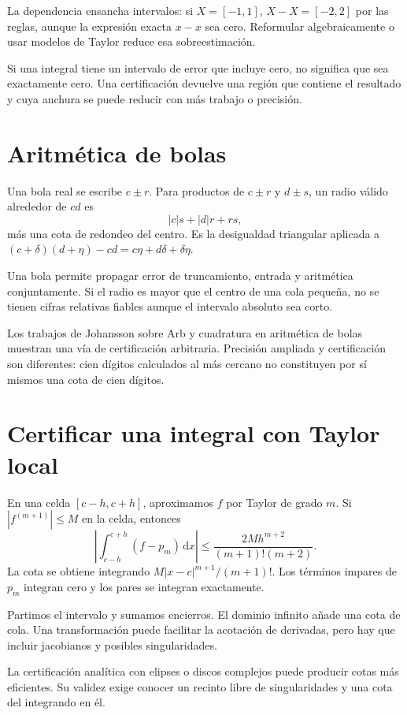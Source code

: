 \documentclass[11pt,a4paper]{article}
\newcommand{\dd}{\,\mathrm d}
\theoremstyle{definition}
\begin{document}
La dependencia ensancha intervalos: si $X=[-1,1]$, $X-X=[-2,2]$ por las reglas, aunque la expresión exacta $x-x$ sea cero. Reformular algebraicamente o usar modelos de Taylor reduce esa sobreestimación.

Si una integral tiene un intervalo de error que incluye cero, no significa que sea exactamente cero. Una certificación devuelve una región que contiene el resultado y cuya anchura se puede reducir con más trabajo o precisión.

\section{Aritmética de bolas}
Una bola real se escribe $c\pm r$. Para productos de $c\pm r$ y $d\pm s$, un radio válido alrededor de $cd$ es
\[
|c|s+|d|r+rs,
\]
más una cota de redondeo del centro. Es la desigualdad triangular aplicada a
$(c+\delta)(d+\eta)-cd=c\eta+d\delta+\delta\eta$.

Una bola permite propagar error de truncamiento, entrada y aritmética conjuntamente. Si el radio es mayor que el centro de una cola pequeña, no se tienen cifras relativas fiables aunque el intervalo absoluto sea corto.

Los trabajos de Johansson sobre Arb y cuadratura en aritmética de bolas muestran una vía de certificación arbitraria. Precisión ampliada y certificación son diferentes: cien dígitos calculados al más cercano no constituyen por sí mismos una cota de cien dígitos.

\section{Certificar una integral con Taylor local}
En una celda $[c-h,c+h]$, aproximamos $f$ por Taylor de grado $m$. Si $|f^{(m+1)}|\le M$ en la celda, entonces
\[
\left|\int_{c-h}^{c+h}(f-p_m)\dd x\right|
\le\frac{2Mh^{m+2}}{(m+1)!(m+2)}.
\]
La cota se obtiene integrando $M|x-c|^{m+1}/(m+1)!$. Los términos impares de $p_m$ integran cero y los pares se integran exactamente.

Partimos el intervalo y sumamos encierros. El dominio infinito añade una cota de cola. Una transformación puede facilitar la acotación de derivadas, pero hay que incluir jacobianos y posibles singularidades.

La certificación analítica con elipses o discos complejos puede producir cotas más eficientes. Su validez exige conocer un recinto libre de singularidades y una cota del integrando en él.
\end{document}
